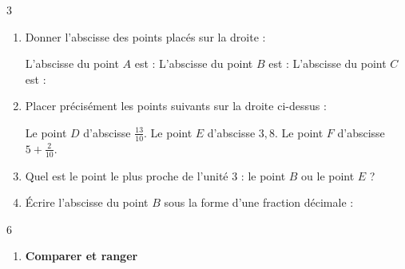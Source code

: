 \documentclass[a4paper]{book}
\begin{document}
{\begin{exerciceNote}{3}
\begin{center}
        \end{center}
        
        \medskip
        
        \begin{enumerate}[leftmargin=*]
            \item Donner l'abscisse des points placés sur la droite :
            
            L'abscisse du point $A$ est : \dotfill \quad \quad
            L'abscisse du point $B$ est : \dotfill \quad \quad
            L'abscisse du point $C$ est : \dotfill

            \medskip
    
            \item Placer précisément les points suivants sur la droite ci-dessus :
    
            Le point $D$ d'abscisse $\frac{13}{10}$. \quad \quad 
            Le point $E$ d'abscisse $3,8$. \quad \quad
            Le point $F$ d'abscisse $5 + \frac{2}{10}$.

            \medskip
    
            \item Quel est le point le plus proche de l'unité 3 : le point $B$ ou le point $E$ ? \dotfill

            \medskip
            
            \item Écrire l'abscisse du point $B$ sous la forme d'une fraction décimale : \dotfill
        \end{enumerate}   
    \end{exerciceNote}


    \begin{exerciceNote}{6}
        \begin{enumerate}[leftmargin=*]
            \item \textbf{Comparer et ranger}


\end{enumerate}
\end{exerciceNote}}
\end{document}
